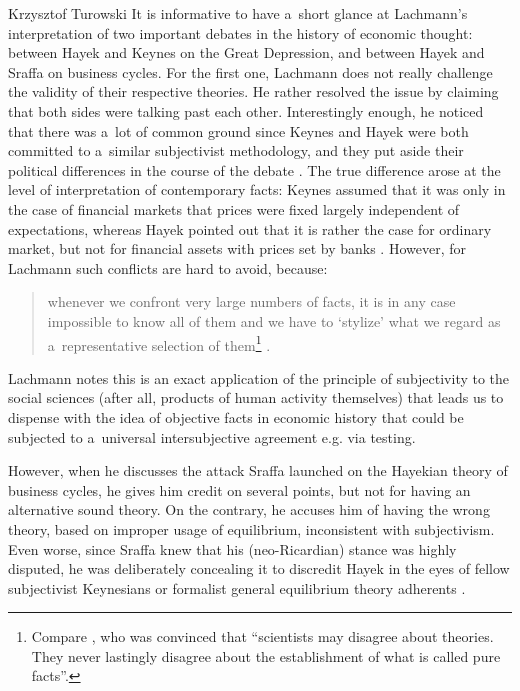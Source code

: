\begin{artengenv}{Krzysztof Turowski}
It is informative to have a~short glance at Lachmann's interpretation of two important debates in the history of economic thought: between Hayek and Keynes on the Great Depression, and between Hayek and Sraffa on business cycles.
For the first one, Lachmann does not really challenge the validity of their respective theories. He rather resolved the issue by claiming that both sides were talking past each other. Interestingly enough, he noticed that there was a~lot of common ground since Keynes and Hayek were both committed to a~similar subjectivist methodology, and they put aside their political differences in the course of the debate \parencite[183]{lachmann-keynes}. The true difference arose at the level of interpretation of contemporary facts: Keynes assumed that it was only in the case of financial markets that prices were fixed largely independent of expectations, whereas Hayek pointed out that it is rather the case for ordinary market, but not for financial assets with prices set by banks \parencite[183--184]{lachmann-keynes}.
However, for Lachmann such conflicts are hard to avoid, because:
\begin{quote}
whenever we confront very large numbers of facts, it is in any case impossible to know all of them and we have to `stylize' what we regard as a~representative selection of them\footnote{Compare \textcite[304]{mises-theory}, who was convinced that ``scientists may disagree about theories. They never lastingly disagree about the establishment of what is called pure facts''.} \parencite[190]{lachmann-keynes}.
\end{quote}
Lachmann notes this is an exact application of the principle of subjectivity to the social sciences (after all, products of human activity themselves) that leads us to dispense with the idea of objective facts in economic history that could be subjected to a~universal intersubjective agreement e.g. via testing.

However, when he discusses the attack Sraffa launched on the Hayekian theory of business cycles, he gives him credit on several points, but not for having an alternative sound theory. On the contrary, he accuses him of having the wrong theory, based on improper usage of equilibrium, inconsistent with subjectivism.
Even worse, since Sraffa knew that his (neo-Ricardian) stance was highly disputed, he was deliberately concealing it to discredit Hayek in the eyes of fellow subjectivist Keynesians or formalist general equilibrium theory adherents \parencite[144--145]{lachmann-hayek-sraffa}.


\end{artengenv}
